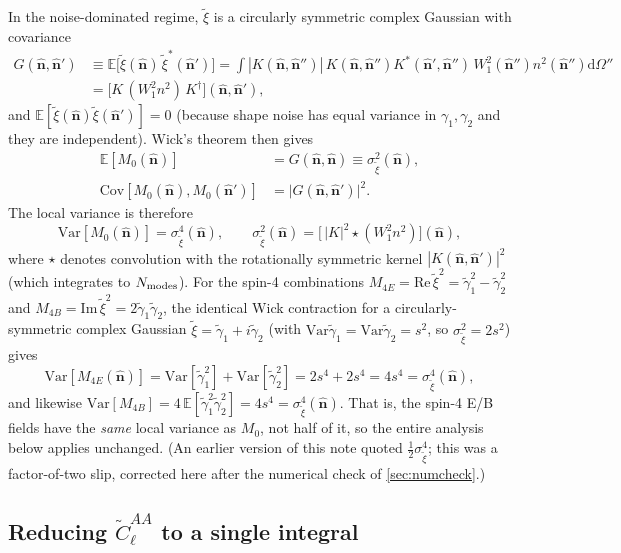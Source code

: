 \documentclass[11pt]{article}
\newcommand{\nv}{\hat{\boldsymbol{n}}}
\newcommand{\dom}{\mathrm{d}\Omega}
\newcommand{\E}{\mathbb{E}}
\newcommand{\Var}{\mathrm{Var}}
\newcommand{\Cov}{\mathrm{Cov}}
\newcommand{\Nmodes}{N_{\rm modes}}
\newcommand{\Wone}{W_1}
\begin{document}
In the noise-dominated regime, $\tilde\xi$ is a circularly symmetric complex
Gaussian with covariance
\begin{align}
G(\nv,\nv')
&\equiv\E\bigl[\tilde\xi(\nv)\,\tilde\xi^*(\nv')\bigr]
=\int|K(\nv,\nv'')|\,K(\nv,\nv'')K^*(\nv',\nv'')\,\Wone^2(\nv'')n^2(\nv'')\dom''
\nonumber\\
&=\bigl[K\,(\Wone^2 n^2)\,K^\dagger\bigr](\nv,\nv'),
\label{eq:Gdef}
\end{align}
and $\E[\tilde\xi(\nv)\tilde\xi(\nv')]=0$ (because shape noise has equal
variance in $\gamma_1,\gamma_2$ and they are independent). Wick's theorem
then gives
\begin{align}
\E[M_0(\nv)]&=G(\nv,\nv)\equiv\sigma^2_{\tilde\xi}(\nv),\\
\Cov[M_0(\nv),M_0(\nv')]
&=\bigl|G(\nv,\nv')\bigr|^2.
\label{eq:CovM0}
\end{align}
The local variance is therefore
\begin{equation}
\Var[M_0(\nv)]=\sigma^4_{\tilde\xi}(\nv),\qquad
\sigma^2_{\tilde\xi}(\nv)=\bigl[\,|K|^2\!\star(\Wone^2 n^2)\bigr](\nv),
\label{eq:sigma2}
\end{equation}
where $\star$ denotes convolution with the rotationally symmetric kernel
$|K(\nv,\nv')|^2$ (which integrates to $\Nmodes$). For the spin-4
combinations $M_{4E}=\mathrm{Re}\,\tilde\xi^2=\tilde\gamma_1^2-\tilde\gamma_2^2$ and
$M_{4B}=\mathrm{Im}\,\tilde\xi^2=2\tilde\gamma_1\tilde\gamma_2$, the identical Wick
contraction for a circularly-symmetric complex Gaussian
$\tilde\xi=\tilde\gamma_1+i\tilde\gamma_2$ (with
$\Var\tilde\gamma_1=\Var\tilde\gamma_2=s^2$, so
$\sigma^2_{\tilde\xi}=2s^2$) gives
\begin{equation}
\Var[M_{4E}(\nv)]=\Var[\tilde\gamma_1^2]+\Var[\tilde\gamma_2^2]
=2s^4+2s^4=4s^4=\sigma^4_{\tilde\xi}(\nv),
\end{equation}
and likewise $\Var[M_{4B}]=4\,\E[\tilde\gamma_1^2\tilde\gamma_2^2]=4s^4=\sigma^4_{\tilde\xi}(\nv)$.
That is, the spin-4 E/B fields have the \emph{same} local variance as
$M_0$, not half of it, so the entire analysis below applies unchanged.
(An earlier version of this note quoted
$\tfrac{1}{2}\sigma^4_{\tilde\xi}$; this was a factor-of-two slip, corrected
here after the numerical check of \cref{sec:numcheck}.)

\subsection{Reducing $\tilde C^{AA}_\ell$ to a single integral}
\end{document}
